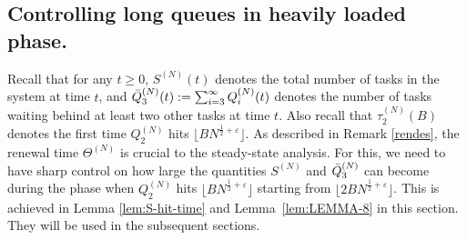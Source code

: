 \documentclass[11pt, reqno]{article}
\numberwithin{equation}{section}
\numberwithin{theorem}{section}
\begin{document}
\subsection{Controlling long queues in heavily loaded phase.}\label{qthree}
Recall that for any $t \ge 0$, $S^{(N)}(t)$ denotes the total number of tasks in the system at time $t$, and $\Bar{Q}^{(N)}_3(t):=\sum_{i=3}^{\infty}Q^{(N)}_i(t)$ denotes the number of tasks waiting behind at least two other tasks at time $t$. Also recall that $\tau_2^{(N)}(B)$ denotes the first time $Q_2^{(N)}$ hits $\lfloor B N^{\frac{1}{2} + \varepsilon}\rfloor$. 
As described in Remark \ref{rendes}, the renewal time $\Theta^{(N)}$ is crucial to the steady-state analysis.
For this, we need to have sharp control on how large the quantities $S^{(N)}$ and $\Bar{Q}^{(N)}_3$ can become during the phase when $Q_2^{(N)}$ hits $\lfloor B N^{\frac{1}{2} + \varepsilon}\rfloor$ starting from $\lfloor 2B N^{\frac{1}{2} + \varepsilon}\rfloor$.
This is achieved in Lemma \ref{lem:S-hit-time} and Lemma~\ref{lem:LEMMA-8} in this section.
They will be used in the subsequent sections.
\end{document}
